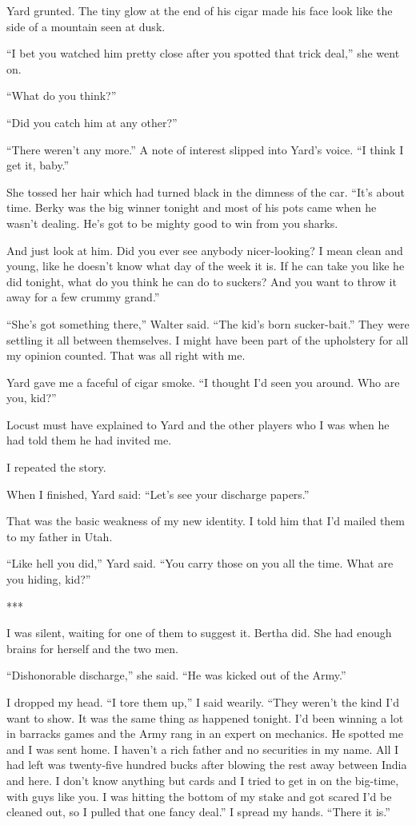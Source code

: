 {Yard grunted. The tiny glow at the end of his cigar made his face look like the side of a mountain seen at dusk.

“I bet you watched him pretty close after you spotted that trick deal,” she went on.

“What do you think?”

“Did you catch him at any other?”

“There weren’t any more.” A note of interest slipped into Yard’s voice. “I think I get it, baby.”

She tossed her hair which had turned black in the dimness of the car. “It’s about time. Berky was the big winner tonight and most of his pots came when he wasn’t dealing. He’s got to be mighty good to win from you sharks.

And just look at him. Did you ever see anybody nicer-looking? I mean clean and young, like he doesn’t know what day of the week it is. If he can take you like he did tonight, what do you think he can do to suckers? And you want to throw it away for a few crummy grand.”

“She’s got something there,” Walter said. “The kid’s born sucker-bait.” They were settling it all between themselves. I might have been part of the upholstery for all my opinion counted. That was all right with me.

Yard gave me a faceful of cigar smoke. “I thought I’d seen you around. Who are you, kid?”

Locust must have explained to Yard and the other players who I was when he had told them he had invited me.

I repeated the story.

When I finished, Yard said: “Let’s see your discharge papers.”

That was the basic weakness of my new identity. I told him that I’d mailed them to my father in Utah.

“Like hell you did,” Yard said. “You carry those on you all the time. What are you hiding, kid?”

***

I was silent, waiting for one of them to suggest it. Bertha did. She had enough brains for herself and the two men.

“Dishonorable discharge,” she said. “He was kicked out of the Army.”

I dropped my head. “I tore them up,” I said wearily. “They weren’t the kind I’d want to show. It was the same thing as happened tonight. I’d been winning a lot in barracks games and the Army rang in an expert on mechanics. He spotted me and I was sent home. I haven’t a rich father and no securities in my name. All I had left was twenty-five hundred bucks after blowing the rest away between India and here. I don’t know anything but cards and I tried to get in on the big-time, with guys like you. I was hitting the bottom of my stake and got scared I’d be cleaned out, so I pulled that one fancy deal.” I spread my hands. “There it is.”

}
